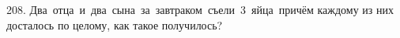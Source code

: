 208. Два отца и два сына за завтраком съели 3 яйца причём каждому из них досталось по целому, как такое получилось?\\
